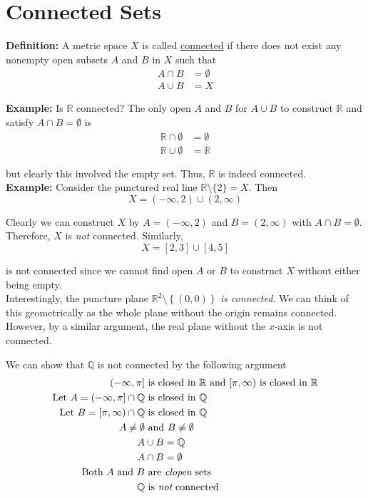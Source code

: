 \documentclass[12pt]{article}
\newlength\tindent
\renewcommand{\indent}{\hspace*{\tindent}}
\newcommand{\R}{\mathbb R}
\newcommand{\Q}{\mathbb Q}
\begin{document}
\section{Connected Sets}

%
%
{\bf Definition:} A metric space $X$ is called \underline{connected} if there does not exist any nonempty open subsets $A$ and $B$ in $X$ such that
\begin{align*}
	A \cap B &= \emptyset \\
	A \cup B &= X
\end{align*}

%
%
{\bf Example:} Is $\R$ connected? The only open $A$ and $B$ for $A \cup B$ to construct $\R$ and satisfy $A \cap B = \emptyset$ is
\begin{align*}
	\R \cap \emptyset &= \emptyset \\
	\R \cup \emptyset &= \R
\end{align*}

but clearly this involved the empty set. Thus, $\R$ is indeed connected. \\

%
%
{\bf Example:} Consider the punctured real line $\R\setminus\{2\} = X$. Then
\begin{equation*}
	X = \left(-\infty, 2\right) \cup \left(2, \infty\right)
\end{equation*}

Clearly we can construct $X$ by $A = \left(-\infty, 2\right)$ and $B = \left(2, \infty\right)$ with $A \cap B = \emptyset$. Therefore, $X$ is {\em not} connected. Similarly,
\begin{equation*}
	X = [2,3]\cup[4,5]
\end{equation*}

is not connected since we cannot find open $A$ or $B$ to construct $X$ without either being empty. \\

\indent Interestingly, the puncture plane $\R^2\setminus \left\{(0,0)\right\}$ {\em is connected}. We can think of this geometrically as the whole plane without the origin remains connected. However, by a similar argument, the real plane without the $x$-axis is not connected.

We can show that $\Q$ is not connected by the following argument
\begin{align*}
	(-\infty,\pi] &\text{ is closed in $\R$ and $[\pi,\infty)$ is closed in $\R$} \\
	\text{Let } A = (-\infty,\pi] \cap \Q &\text{ is closed in $\Q$} \\
	\text{Let } B = [\pi,\infty) \cap \Q &\text{ is closed in $\Q$} \\
	A \neq \emptyset &\text{ and } B \neq \emptyset \\
	A &\cup B = \Q \\
	A &\cap B = \emptyset \\
	\text{Both $A$ and $B$} &\text{ are {\em clopen} sets} \\
	\Q &\text{ is {\em not} connected}
\end{align*}
\end{document}
